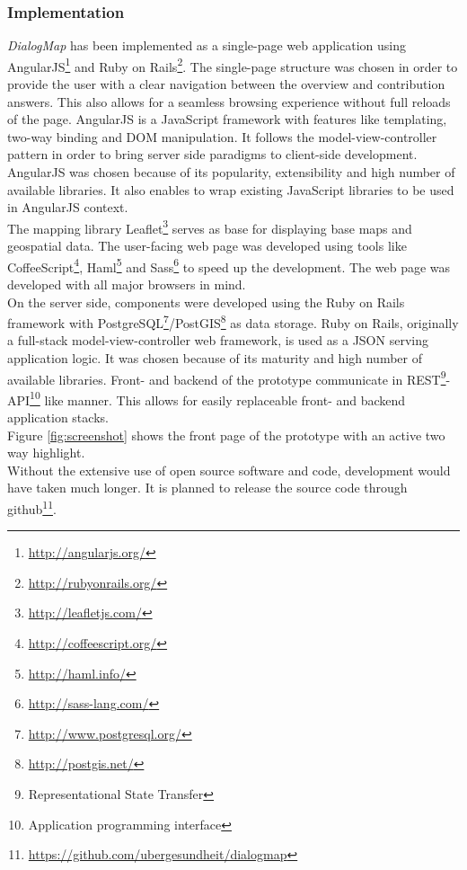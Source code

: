 \documentclass{sigchi}
\begin{document}
\subsubsection{Implementation}
\textit{DialogMap} has been implemented as a single-page web application using AngularJS\footnote{\url{http://angularjs.org/}} and Ruby on Rails\footnote{\url{http://rubyonrails.org/}}. The single-page structure was chosen in order to provide the user with a clear navigation between the overview and contribution answers. This also allows for a seamless browsing experience without full reloads of the page. AngularJS is a JavaScript framework with features like templating, two-way binding and DOM manipulation. It follows the model-view-controller pattern in order to bring server side paradigms to client-side development. AngularJS was chosen because of its popularity, extensibility and high number of available libraries. It also enables to wrap existing JavaScript libraries to be used in AngularJS context.\\
The mapping library Leaflet\footnote{\url{http://leafletjs.com/}} serves as base for displaying base maps and geospatial data. The user-facing web page was developed using tools like CoffeeScript\footnote{\url{http://coffeescript.org/}}, Haml\footnote{\url{http://haml.info/}} and Sass\footnote{\url{http://sass-lang.com/}} to speed up the development. The web page was developed with all major browsers in mind.\\
On the server side, components were developed using the Ruby on Rails framework with PostgreSQL\footnote{\url{http://www.postgresql.org/}}/PostGIS\footnote{\url{http://postgis.net/}} as data storage. Ruby on Rails, originally a full-stack model-view-controller web framework, is used as a JSON serving application logic. It was chosen because of its maturity and high number of available libraries. Front- and backend of the prototype communicate in REST\footnote{Representational State Transfer}-API\footnote{Application programming interface} like manner. This allows for easily replaceable front- and backend application stacks.\\
Figure \ref{fig:screenshot} shows the front page of the prototype with an active two way highlight.\\
Without the extensive use of open source software and code, development would have taken much longer. It is planned to release the source code through github\footnote{\url{https://github.com/ubergesundheit/dialogmap}}.
\end{document}
